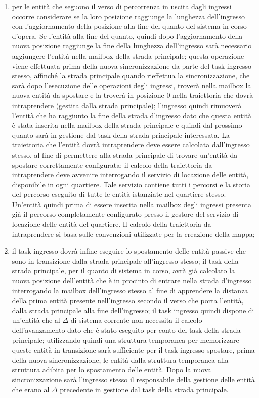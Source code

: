 \begin{enumerate}
\item per le entità che seguono il verso di percorrenza in uscita dagli ingressi
occorre considerare se la loro posizione raggiunge la lunghezza dell'ingresso con l'aggiornamento della posizione alla fine del quanto del sistema in corso d'opera. Se l'entità alla fine del quanto, quindi dopo l'aggiornamento della nuova posizione raggiunge la fine della lunghezza dell'ingresso sarà necessario aggiungere l'entità nella mailbox della strada principale; questa operazione viene effettuata prima della nuova sincronizzazione da parte del task ingresso stesso, affinché la strada principale quando rieffettua la sincronizzazione, che sarà dopo l'esecuzione delle operazioni degli ingressi, troverà nella mailbox la nuova entità da spostare e la troverà in posizione 0 nella traiettoria che dovrà intraprendere (gestita dalla strada principale); l'ingresso quindi rimuoverà l'entità che ha raggiunto la fine della strada d'ingresso dato che questa entità è stata inserita nella mailbox della strada principale e quindi dal prossimo quanto sarà in gestione dal task della strada principale interessata. La traiettoria che l'entità dovrà intraprendere deve essere calcolata dall'ingresso stesso, al fine di permettere alla strada principale di trovare un'entità da spostare correttamente configurata; il calcolo della traiettoria da intraprendere deve avvenire interrogando il servizio di locazione delle entità, disponibile in ogni quartiere. Tale servizio contiene tutti i percorsi e la storia del percorso eseguito di tutte le entità istanziate nel quartiere stesso. Un'entità quindi prima di essere inserita nella mailbox degli ingressi presenta già il percorso completamente configurato presso il gestore del servizio di locazione delle entità del quartiere. Il calcolo della traiettoria da intraprendere si basa sulle convenzioni utilizzate per la creazione della mappa;
\item il task ingresso dovrà infine eseguire lo spostamento delle entità passive che sono in transizione dalla strada principale all'ingresso stesso; il task della strada principale, per il quanto di sistema in corso, avrà già calcolato la nuova posizione dell'entità che è in procinto di entrare nella strada d'ingresso interrogando la mailbox dell'ingresso stesso al fine di apprendere la distanza della prima entità presente nell'ingresso secondo il verso che porta l'entità, dalla strada principale alla fine dell'ingresso; il task ingresso quindi dispone di un'entità che al $\Delta$ di sistema corrente non necessita il calcolo dell'avanzamento dato che è stato eseguito per conto del task della strada principale; utilizzando quindi una struttura temporanea per memorizzare queste entità in transizione sarà sufficiente per il task ingresso spostare, prima della nuova sincronizzazione, le entità dalla struttura temporanea alla struttura adibita per lo spostamento delle entità. Dopo la nuova sincronizzazione sarà l'ingresso stesso il responsabile della gestione delle entità che erano al $\Delta$ precedente in gestione dal task della strada principale.
\end{enumerate}
